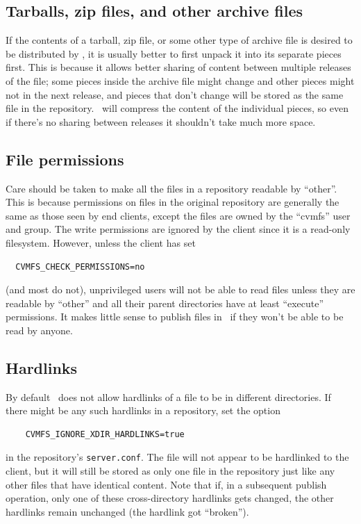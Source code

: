 \subsection{Tarballs, zip files, and other archive files}
If the contents of a tarball, zip file, or some other type of archive file is desired to be distributed by \cvmfs, it is usually better to first unpack it into its separate pieces first.
This is because it allows better sharing of content between multiple releases of the file;
some pieces inside the archive file might change and other pieces might not in the next release, and pieces that don't change will be stored as the same file in the repository.
\cvmfs\ will compress the content of the individual pieces, so even if there's no sharing between releases it shouldn't take much more space.

\subsection{File permissions}
Care should be taken to make all the files in a repository readable by ``other''.
This is because permissions on files in the original repository are generally the same as those seen by end clients, except the files are owned by the ``cvmfs'' user and group.
The write permissions are ignored by the client since it is a read-only filesystem.
However, unless the client has set
\begin{verbatim}
  CVMFS_CHECK_PERMISSIONS=no
\end{verbatim}
(and most do not), unprivileged users will not be able to read files unless they are readable by ``other'' and all their parent directories have at least ``execute'' permissions.
It makes little sense to publish files in \cvmfs\ if they won't be able to be read by anyone.

\subsection{Hardlinks}
By default \cvmfs\ does not allow hardlinks of a file to be in different directories.
If there might be any such hardlinks in a repository, set the option
\begin{verbatim}
    CVMFS_IGNORE_XDIR_HARDLINKS=true
\end{verbatim}
in the repository's \texttt{server.conf}.
The file will not appear to be hardlinked to the client, but it will still be stored as only one file in the repository just like any other files that have identical content.
Note that if, in a subsequent publish operation, only one of these cross-directory hardlinks gets changed, the other hardlinks remain unchanged (the hardlink got ``broken'').
